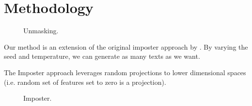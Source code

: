 \chapter{Methodology}
\label{chap:methodology}








\begin{figure}[htbp]
    \centering
    
    \caption{Unmasking.}
    \label{fig:unmasking}
\end{figure}
Our method is an extension of the original imposter approach by \citet{koppel_determining_2014}.
By varying the seed and temperature, we can generate as many texts as we want.
  
    
The Imposter approach leverages random projections to lower dimensional spaces (i.e. random set of features set to zero is a projection).
\begin{figure}[htbp]
    \centering
    
    \caption{Imposter.}
    \label{fig:imposter}
\end{figure}



